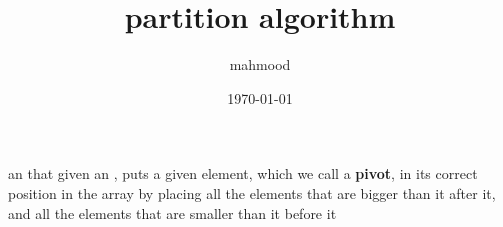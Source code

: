 \documentclass[a4paper,12pt]{article}
\author{mahmood}
\date{\today}
\title{partition algorithm}
\begin{document}
\maketitle
an that given an , puts a given element, which we call a \textbf{pivot}, in its correct position in the array by placing all the elements that are bigger than it after it, and all the elements that are smaller than it before it\\[0pt]

\end{document}
